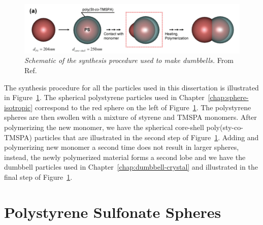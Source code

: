 \begin{figure}[htbp]
\centering
\includegraphics[width=1\textwidth]{figures/synthesisScheme.pdf}
\caption{\label{fig:synthesis-scheme}\emph{Schematic of the synthesis procedure used to make dumbbells.}
From Ref.~\cite{Park2010}}
\end{figure}

The synthesis procedure for all the particles used in this dissertation is illustrated in Figure~\ref{fig:synthesis-scheme}.
The spherical polystyrene particles used in Chapter~\ref{chap:sphere-isotropic} correspond to the red sphere on the left of Figure~\ref{fig:synthesis-scheme}.
The polystyrene spheres are then swollen with a mixture of styrene and TMSPA monomers.
After polymerizing the new monomer, we have the spherical core-shell poly(sty-co-TMSPA) particles that are illustrated in the second step of Figure~\ref{fig:synthesis-scheme}.
Adding and polymerizing new monomer a second time does not result in larger spheres, instead, the newly polymerized material forms a second lobe and we have the dumbbell particles used in Chapter~\ref{chap:dumbbell-crystal} and illustrated in the final step of Figure~\ref{fig:synthesis-scheme}.



\section{Polystyrene Sulfonate Spheres}
\label{chap:synthesis:ps}

